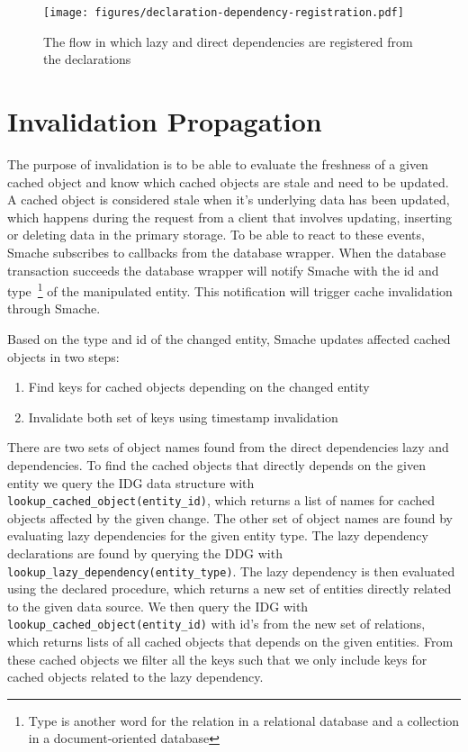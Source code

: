 \begin{figure*}[ht!]
  \centering
  \texttt{[image: figures/declaration-dependency-registration.pdf]}
  \caption{The flow in which lazy and direct dependencies are registered from the declarations}
  \label{fig:declaration-dependency-registration}
\end{figure*}

\newpage

\section{Invalidation Propagation}
\label{sec:invalidation-propagation}

The purpose of invalidation is to be able to evaluate the freshness of a given cached object and know which cached objects are stale and need to be updated. A cached object is considered stale when it's underlying data has been updated, which happens during the request from a client that involves updating, inserting or deleting data in the primary storage. To be able to react to these events, Smache subscribes to callbacks from the database wrapper. When the database transaction succeeds the database wrapper will notify Smache with the id and type~\footnote{Type is another word for the relation in a relational database and a collection in a document-oriented database} of the manipulated entity. This notification will trigger cache invalidation through Smache.

Based on the type and id of the changed entity, Smache updates affected cached objects in two steps:

\begin{enumerate}
  \item Find keys for cached objects depending on the changed entity
  \item Invalidate both set of keys using timestamp invalidation
\end{enumerate}

There are two sets of object names found from the direct dependencies lazy and dependencies. To find the cached objects that directly depends on the given entity we query the IDG data structure with \verb$lookup_cached_object(entity_id)$, which returns a list of names for cached objects affected by the given change. The other set of object names are found by evaluating lazy dependencies for the given entity type.
The lazy dependency declarations are found by querying the DDG with \verb$lookup_lazy_dependency(entity_type)$. The lazy dependency is then evaluated using the declared procedure, which returns a new set of entities directly related to the given data source. We then query the IDG with \verb$lookup_cached_object(entity_id)$ with id's from the new set of relations, which returns lists of all cached objects that depends on the given entities. From these cached objects we filter all the keys such that we only include keys for cached objects related to the lazy dependency.

